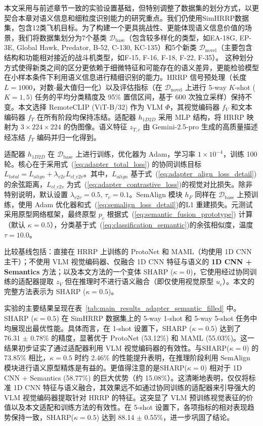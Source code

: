 本文采用与前述章节一致的实验设置基础，但特别调整了数据集的划分方式，以更契合本章对语义信息和细粒度识别能力的研究重点。我们仍使用SimHRRP数据集，包含12类飞机目标。为了构建一个更具挑战性、更能体现语义信息价值的场景，我们将数据集划分为7个基类 $\mathcal{D}_{\text{base}}$（包含较多样化的类型，如EA-18G, EP-3E, Global Hawk, Predator, B-52, C-130, KC-135）和5个新类 $\mathcal{D}_{\text{novel}}$（主要包含结构和功能相对接近的战斗机类型，如F-15, F-16, F-18, F-22, F-35）。 这种划分方式使得新类之间的区分更依赖于细微特征和可能存在的语义差异，更能检验模型在小样本条件下利用语义信息进行精细识别的能力。HRRP 信号预处理（长度 $L=1000$，对数-最大值归一化）以及评估指标（在 $\mathcal{D}_{\text{novel}}$ 上进行 5-way $K$-shot ($K=1, 5$) 任务的平均分类精度及 95\% 置信区间，基于 600 次独立采样）保持不变。本文选择 RemoteCLIP (ViT-B/32) 作为 VLM $\Phi$，其视觉编码器 $f_V$ 和文本编码器 $f_T$ 在所有阶段均保持冻结。适配器 $h_{1D2D}$ 采用 MLP 结构，将 HRRP 映射为 $3 \times 224 \times 224$ 的伪图像。语义特征 $z_{T,c}$ 由 Gemini-2.5-pro 生成的高质量描述经冻结 $f_T$ 编码并归一化得到。

适配器 $h_{1D2D}$ 在 $\mathcal{D}_{\text{base}}$ 上进行训练，优化器为 Adam，学习率 $1 \times 10^{-4}$，训练 100 轮。核心在于采用式~(\ref{eq:adapter_total_loss}) 的协同训练目标 $L_{total} = L_{align} + \lambda_{v2v} L_{cl\_v2v}$。其中，$L_{align}$ 基于式~(\ref{eq:adapter_align_loss_detail})的余弦距离，$L_{cl\_v2v}$ 为式~(\ref{eq:adapter_contrastive_loss})的视觉对比损失。除非特别说明，默认设置 $\lambda_{v2v}=0.5$, $\tau_v=0.1$。SemAlign 模块 $h_F$ 同样在 $\mathcal{D}_{\text{base}}$ 上预训练，使用 Adam 优化器和式~(\ref{eq:semalign_loss_detail})的L1 重建损失。元测试采用原型网络框架，最终原型 $p_c$ 根据式~(\ref{eq:semantic_fusion_prototype}) 计算（默认 $\kappa=0.5$），分类基于式~(\ref{eq:classification_semantic})的余弦相似度，温度 $\tau=10.0$。
 
比较基线包括：直接在 HRRP 上训练的 ProtoNet 和 MAML（均使用 1D CNN 主干）；不使用 VLM 视觉编码器、仅融合 1D CNN 特征与语义的 \textbf{1D CNN + Semantics} 方法；以及本文方法的一个变体 {SHARP ($\kappa=0$)}，它使用经过协同训练的适配器提取 $z_V$ 但在推理时不进行语义融合（即仅使用视觉原型 $u_c$）。本文的完整方法表示为 {SHARP ($\kappa=0.5$)}。
 
实验的主要结果呈现在表~\ref{tab:main_results_adapter_semantic_filled} 中。SHARP ($\kappa=0.5$) 在 SimHRRP 数据集上的 5-way 1-shot 和 5-way 5-shot 任务中均展现出最优性能。具体而言，在 1-shot 设置下，SHARP ($\kappa=0.5$) 达到了 76.31 $\pm$ 0.78\% 的精度，显著优于 ProtoNet (53.12\%) 和 MAML (55.03\%)。这一结果初步证实了通过适配器利用 VLM 视觉编码器的有效性。与SHARP($\kappa=0$) 的 73.85\% 相比，$\kappa=0.5$ 时约 2.46\% 的性能提升表明，在推理阶段利用 SemAlign 模块进行语义原型精炼是有益的。更值得注意的是SHARP($\kappa=0$) 相对于 1D CNN + Semantics (58.77\%) 的巨大优势（约 15.08\%）。这清晰地表明，仅仅将标准 1D CNN 特征与语义融合，其效果远不如通过协同训练的适配器来引导强大的 VLM 视觉编码器提取针对 HRRP 的特征。这突显了 VLM 预训练视觉表征的价值以及本文适配和训练方法的有效性。在 5-shot 设置下，各项指标的相对表现趋势保持一致，SHARP($\kappa=0.5$) 达到 88.14 $\pm$ 0.55\%，进一步巩固了结论。

